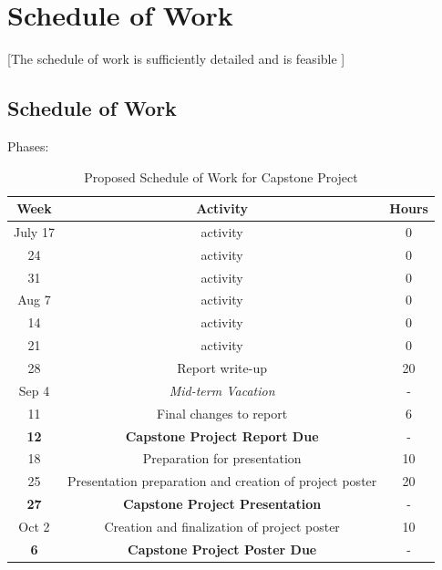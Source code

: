 \documentclass[a4paper,twoside,12pt]{report}
\begin{document}
\chapter{Schedule of Work}
[The schedule of work is sufficiently detailed
and is feasible
]
\section{Schedule of Work}
Phases:


\begin{table}[p]
	\centering
	\caption{Proposed Schedule of Work for Capstone Project}
	\label{tab:workScheduleTable}
\begin{tabular}{ccc}
	\hline
	Week & Activity & Hours\\
	\hline\hline 
	July 17 & activity & 0 \\ 
	24 & activity & 0 \\ 
    31 & activity & 0 \\ 
    \hline
    Aug 7 & activity & 0 \\ 
    14 & activity & 0 \\ 
    21 & activity & 0 \\ 
    28 & Report write-up & 20 \\ 
    \hline
    Sep 4 & \textit{Mid-term Vacation} & - \\ 
    11 & Final changes to report & 6 \\ 
    \textbf{12} & \textbf{Capstone Project Report Due} & - \\ 
    18 & Preparation for presentation & 10 \\
    25 & Presentation preparation and creation of project poster & 20 \\
    \textbf{27} & \textbf{Capstone Project Presentation} & - \\ 
	\hline
    Oct 2 & Creation and finalization of project poster & 10 \\
    \textbf{6} & \textbf{Capstone Project Poster Due} & - \\ 
    \hline
\end{tabular} 
\end{table}

\nocite{*}

\end{document}
